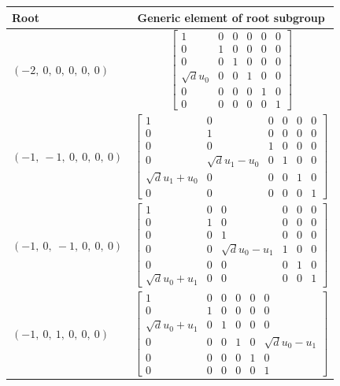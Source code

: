 \documentclass[11pt]{article}
\theoremstyle{definition}
\begin{document}
\noindent \begin{longtable}{|l|c|}
    \hline
    \textbf{Root} & \textbf{Generic element of root subgroup} \\
    \hline
    \endhead
    $\left( -2, \  0, \  0, \  0, \  0, \  0\right)$ & ${\left[\begin{matrix}1 & 0 & 0 & 0 & 0 & 0\\0 & 1 & 0 & 0 & 0 & 0\\0 & 0 & 1 & 0 & 0 & 0\\\sqrt{d} u_{0} & 0 & 0 & 1 & 0 & 0\\0 & 0 & 0 & 0 & 1 & 0\\0 & 0 & 0 & 0 & 0 & 1\end{matrix}\right]}$ \\
    \hline
    $\left( -1, \  -1, \  0, \  0, \  0, \  0\right)$ & ${\left[\begin{matrix}1 & 0 & 0 & 0 & 0 & 0\\0 & 1 & 0 & 0 & 0 & 0\\0 & 0 & 1 & 0 & 0 & 0\\0 & \sqrt{d} u_{1} - u_{0} & 0 & 1 & 0 & 0\\\sqrt{d} u_{1} + u_{0} & 0 & 0 & 0 & 1 & 0\\0 & 0 & 0 & 0 & 0 & 1\end{matrix}\right]}$ \\
    \hline
    $\left( -1, \  0, \  -1, \  0, \  0, \  0\right)$ & ${\left[\begin{matrix}1 & 0 & 0 & 0 & 0 & 0\\0 & 1 & 0 & 0 & 0 & 0\\0 & 0 & 1 & 0 & 0 & 0\\0 & 0 & \sqrt{d} u_{0} - u_{1} & 1 & 0 & 0\\0 & 0 & 0 & 0 & 1 & 0\\\sqrt{d} u_{0} + u_{1} & 0 & 0 & 0 & 0 & 1\end{matrix}\right]}$ \\
    \hline
    $\left( -1, \  0, \  1, \  0, \  0, \  0\right)$ & ${\left[\begin{matrix}1 & 0 & 0 & 0 & 0 & 0\\0 & 1 & 0 & 0 & 0 & 0\\\sqrt{d} u_{0} + u_{1} & 0 & 1 & 0 & 0 & 0\\0 & 0 & 0 & 1 & 0 & \sqrt{d} u_{0} - u_{1}\\0 & 0 & 0 & 0 & 1 & 0\\0 & 0 & 0 & 0 & 0 & 1\end{matrix}\right]}$ \\

\end{longtable}
\end{document}
